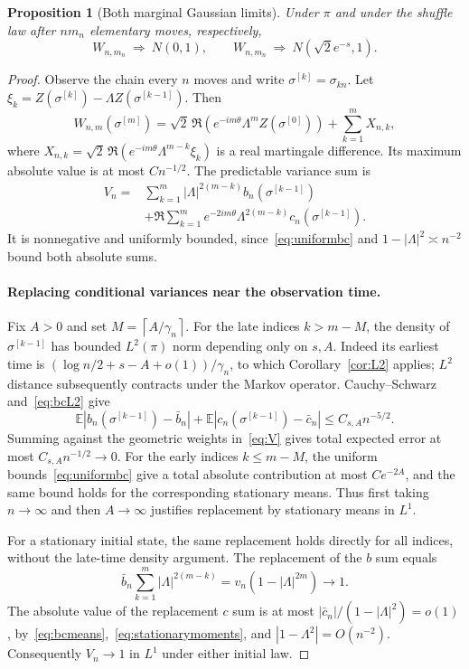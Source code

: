 \documentclass[11pt]{article}
\newtheorem{proposition}[theorem]{Proposition}
\theoremstyle{remark}
\newcommand{\E}{\mathbb E}
\newcommand{\ceil}[1]{\left\lceil #1\right\rceil}
\begin{document}
\begin{proposition}[Both marginal Gaussian limits]\label{prop:clt}
Under $\pi$ and under the shuffle law after $nm_n$ elementary moves, respectively,
\[
 W_{n,m_n}\ \Longrightarrow\ N(0,1),\qquad
 W_{n,m_n}\ \Longrightarrow\ N(\sqrt2e^{-s},1).
\]
\end{proposition}
\begin{proof}
Observe the chain every $n$ moves and write $\sigma^{[k]}=\sigma_{kn}$. Let
$\xi_k=Z(\sigma^{[k]})-\Lambda Z(\sigma^{[k-1]})$.
Then
\[
 W_{n,m}(\sigma^{[m]})
 =\sqrt2\,\Re(e^{-im\theta}\Lambda^m Z(\sigma^{[0]}))+
   \sum_{k=1}^m X_{n,k},
\]
where
$X_{n,k}=\sqrt2\,\Re(e^{-im\theta}\Lambda^{m-k}\xi_k)$
is a real martingale difference. Its maximum absolute value is at most $Cn^{-1/2}$.
The predictable variance sum is
\begin{align}\label{eq:V}
 V_n={}&\sum_{k=1}^m|\Lambda|^{2(m-k)}b_n(\sigma^{[k-1]})\\
 &+\Re\sum_{k=1}^m e^{-2im\theta}\Lambda^{2(m-k)}c_n(\sigma^{[k-1]}).
 \nonumber
\end{align}
It is nonnegative and uniformly bounded, since~\eqref{eq:uniformbc} and
$1-|\Lambda|^2\asymp n^{-2}$ bound both absolute sums.

\paragraph{Replacing conditional variances near the observation time.}
Fix $A>0$ and set $M=\ceil{A/\gamma_n}$. For the late indices $k>m-M$, the density of $\sigma^{[k-1]}$ has bounded $L^2(\pi)$ norm depending only on $s,A$. Indeed its earliest time is
$(\log n/2+s-A+o(1))/\gamma_n$, to which Corollary~\ref{cor:L2} applies; $L^2$ distance subsequently contracts under the Markov operator. Cauchy--Schwarz and~\eqref{eq:bcL2} give
\[
 \E|b_n(\sigma^{[k-1]})-\bar b_n|+
 \E|c_n(\sigma^{[k-1]})-\bar c_n|
 \leq C_{s,A}n^{-5/2}.
\]
Summing against the geometric weights in~\eqref{eq:V} gives total expected error at most $C_{s,A}n^{-1/2}\to0$.
For the early indices $k\leq m-M$, the uniform bounds~\eqref{eq:uniformbc} give a total absolute contribution at most $Ce^{-2A}$, and the same bound holds for the corresponding stationary means. Thus first taking $n\to\infty$ and then $A\to\infty$ justifies replacement by stationary means in $L^1$.

For a stationary initial state, the same replacement holds directly for all indices, without the late-time density argument. The replacement of the $b$ sum equals
\[
 \bar b_n\sum_{k=1}^m|\Lambda|^{2(m-k)}
 =v_n(1-|\Lambda|^{2m})\longrightarrow1.
\]
The absolute value of the replacement $c$ sum is at most
$|\bar c_n|/(1-|\Lambda|^2)=o(1)$, by~\eqref{eq:bcmeans},~\eqref{eq:stationarymoments}, and
$|1-\Lambda^2|=O(n^{-2})$. Consequently $V_n\to1$ in $L^1$ under either initial law.


\end{proof}
\end{document}

